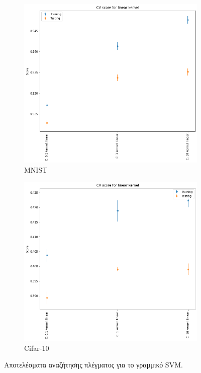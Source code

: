 \documentclass[a4paper]{article}
\begin{document}
\begin{figure}[H]
    \centering

    \begin{subfigure}[t]{0.45\linewidth}
    \includegraphics[width=\linewidth]{figures/mnist/cv_results_linear.png}
    \caption{MNIST}
    \end{subfigure}
    \begin{subfigure}[t]{0.45\linewidth}
    \includegraphics[width=\linewidth]{figures/cifar/cv_results_linear.png}
    \caption{Cifar-10}
    \end{subfigure}

    \caption{Αποτελέσματα αναζήτησης πλέγματος για το γραμμικό SVM.}
    \label{fig:cv_linear}
\end{figure}
\end{document}

